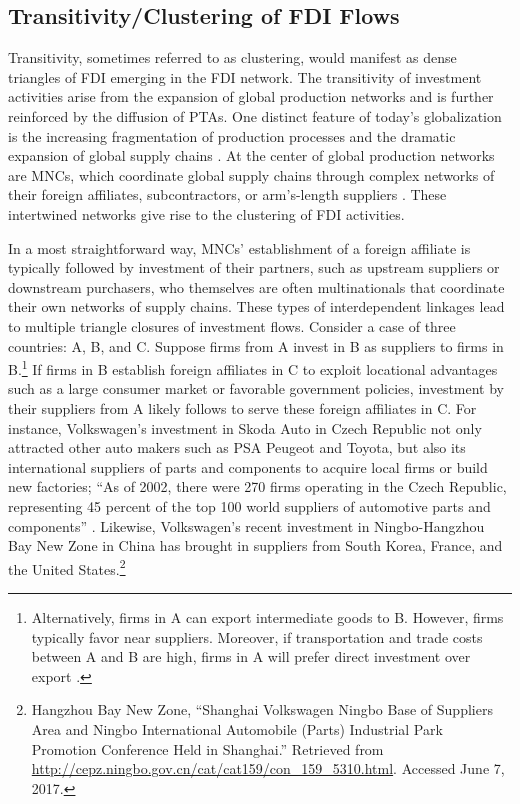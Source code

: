 \documentclass[reqno,onecolumn,letterpaper,12pt]{article}
\begin{document}
\subsection{Transitivity/Clustering of FDI Flows}
Transitivity, sometimes referred to as clustering, would manifest as dense triangles of FDI emerging in the FDI network. The transitivity of investment activities arise from the expansion of global production networks and is further reinforced by the diffusion of PTAs. One distinct feature of today's globalization is the increasing fragmentation of production processes and the dramatic expansion of global supply chains \citep{UNCTAD:2013,Baldwin:2011}. At the center of global production networks are MNCs, which coordinate global supply chains through complex networks of their foreign affiliates, subcontractors, or arm's-length suppliers \citep[xxii]{UNCTAD:2013}. These intertwined networks give rise to the clustering of FDI activities.

In a most straightforward way, MNCs' establishment of a foreign affiliate is typically followed by investment of their partners, such as upstream suppliers or downstream purchasers, who themselves are often multinationals that coordinate their own networks of supply chains. These types of interdependent linkages lead to multiple triangle closures of investment flows. Consider a case of three countries: A, B, and C. Suppose firms from A invest in B as suppliers to firms in B.\footnote{Alternatively, firms in A can export intermediate goods to B. However, firms typically favor near suppliers. Moreover, if transportation and trade costs between A and B are high, firms in A will prefer direct investment over export \citep{Carr_et_al:2001}. } If firms in B establish foreign affiliates in C to exploit locational advantages such as a large consumer market or favorable government policies, investment by their suppliers from A likely follows to serve these foreign affiliates in C. For instance, Volkswagen's investment in Skoda Auto in Czech Republic not only attracted other auto makers such as PSA Peugeot and Toyota, but also its international suppliers of parts and components to acquire local firms or build new factories; ``As of 2002, there were 270 firms operating in the Czech Republic, representing 45 percent of the top 100 world suppliers of automotive parts and components'' \citep[352]{Kaminski_Javorcik:2005}. Likewise, Volkswagen's recent investment in Ningbo-Hangzhou Bay New Zone in China has brought in suppliers from South Korea, France, and the United States.\footnote{Hangzhou Bay New Zone, ``Shanghai Volkswagen Ningbo Base of Suppliers Area and Ningbo International Automobile (Parts) Industrial Park Promotion Conference Held in Shanghai.'' Retrieved from \url{http://cepz.ningbo.gov.cn/cat/cat159/con_159_5310.html}. Accessed June 7, 2017.}
\end{document}
